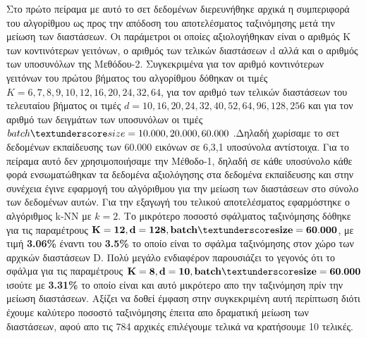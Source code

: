 \par
Στο πρώτο πείραμα με αυτό το σετ δεδομένων διερευνήθηκε αρχικά η συμπεριφορά του αλγορίθμου ως προς την απόδοση του αποτελέσματος ταξινόμησης μετά την μείωση των διαστάσεων. Οι παράμετροι οι οποίες αξιολογήθηκαν είναι ο αριθμός \textlatin{K} των κοντινότερων γειτόνων, ο αριθμός των τελικών διαστάσεων \textlatin{d} αλλά και ο αριθμός των υποσυνόλων της Μεθόδου-2. Συγκεκριμένα για τον αριθμό κοντινότερων γειτόνων του πρώτου βήματος του αλγορίθμου δόθηκαν οι τιμές $K = 6,7,8,9,10,12,16,20,24,32,64$, για τον αριθμό των τελικών διαστάσεων του τελευταίου βήματος οι τιμές $d = 10,16,20,24,32,40,52,64,96,128,256$ και για τον αριθμό των δειγμάτων των υποσυνόλων οι τιμές $batch\textunderscore size = 10.000,20.000,60.000$ .Δηλαδή χωρίσαμε το σετ δεδομένων εκπαίδευσης των 60.000 εικόνων σε 6,3,1 υποσύνολα αντίστοιχα. Για το πείραμα αυτό δεν χρησιμοποιήσαμε την Μέθοδο-1, δηλαδή σε κάθε υποσύνολο κάθε φορά ενσωματώθηκαν τα δεδομένα αξιολόγησης στα δεδομένα εκπαίδευσης και στην συνέχεια έγινε εφαρμογή του αλγόριθμου για την μείωση των διαστάσεων στο σύνολο των δεδομένων αυτών. Για την εξαγωγή του τελικού αποτελέσματος εφαρμόστηκε ο αλγόριθμος \textlatin{k-NN} με $k=2$. Το μικρότερο ποσοστό σφάλματος ταξινόμησης δόθηκε για τις παραμέτρους $\mathbf{K=12, d=128, batch\textunderscore size=60.000}$, με τιμή \textbf{3.06\%} έναντι του \textbf{3.5\%} το οποίο είναι το σφάλμα ταξινόμησης στον χώρο των αρχικών διαστάσεων \textlatin{D}. Πολύ μεγάλο ενδιαφέρον παρουσιάζει το γεγονός ότι το σφάλμα για τις παραμέτρους $\mathbf{K=8, d=10, batch\textunderscore size=60.000}$ ισούτε με \textbf{3.31\%} το οποίο είναι και αυτό μικρότερο απο την ταξινόμηση πρίν την μείωση διαστάσεων. Αξίζει να δοθεί έμφαση στην συγκεκριμένη αυτή περίπτωση διότι έχουμε καλύτερο ποσοστό ταξινόμησης έπειτα απο δραματική μείωση των διαστάσεων, αφού απο τις 784 αρχικές επιλέγουμε τελικά να κρατήσουμε 10 τελικές. 
\par
